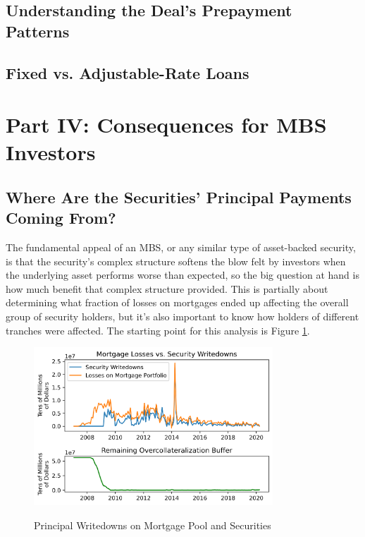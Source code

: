 \documentclass[12pt]{article}
\begin{document}
\subsection*{Understanding the Deal's Prepayment Patterns}


\subsection*{Fixed vs. Adjustable-Rate Loans}


\section*{Part IV: Consequences for MBS Investors}

\subsection*{Where Are the Securities' Principal Payments Coming From?}

The fundamental appeal of an MBS, or any similar type of asset-backed security, is that the security’s complex structure softens the blow felt by investors when the underlying asset performs worse than expected, so the big question at hand is how much benefit that complex structure provided. This is partially about determining what fraction of losses on mortgages ended up affecting the overall group of security holders, but it’s also important to know how holders of different tranches were affected. The starting point for this analysis is Figure \ref{fig:timeseries_losses_vs_writedowns}.

\begin{figure}[h]
	\centering
	\caption{Principal Writedowns on Mortgage Pool and Securities}
	\includegraphics[width=0.8\textwidth]{../figures/timeseries_losses_vs_writedowns}
	\label{fig:timeseries_losses_vs_writedowns}
\end{figure}
\end{document}

